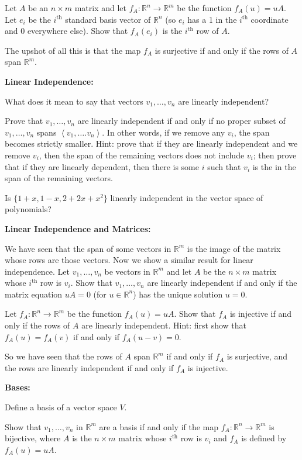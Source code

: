 \documentclass{article}
\newcommand{\SP}[1]{\left\langle #1 \right\rangle}
\begin{document}
Let $A$ be an $n\times m$ matrix and let $f_A:\mathbb{R}^n\to\mathbb{R}^m$ be the function $f_A(u)=uA$. Let $e_i$ be the $i^\mathrm{th}$ standard basis vector of $\mathbb{R}^n$ (so $e_i$ has a 1 in the $i^\mathrm{th}$ coordinate and 0 everywhere else). Show that $f_A(e_i)$ is the $i^\mathrm{th}$ row of $A$.

\vfill

The upshot of all this is that the map $f_A$ is surjective if and only if the rows of $A$ span $\mathbb{R}^m$.


\clearpage

\textbf{Linear Independence:}\bigskip


What does it mean to say that vectors $v_1,\hdots,v_n$ are linearly independent?

\vfill


Prove that $v_1,\hdots,v_n$ are linearly independent if and only if no proper subset of $v_1,\hdots,v_n$ spans $\SP{v_1,\hdots.v_n}$. In other words, if we remove any $v_i$, the span becomes strictly smaller. Hint: prove that if they are linearly independent and we remove $v_i$, then the span of the remaining vectors does not include $v_i$; then prove that if they are linearly dependent, then there is some $i$ such that $v_i$ is the in the span of the remaining vectors.

\vfill

Is $\{1+x,1-x,2+2x+x^2\}$ linearly independent in the vector space of polynomials?

\clearpage


\textbf{Linear Independence and Matrices:}\bigskip

We have seen that the span of some vectors in $\mathbb{R}^m$ is the image of the matrix whose rows are those vectors. Now we show a similar result for linear independence. Let $v_1,\hdots,v_n$ be vectors in $\mathbb{R}^m$ and let $A$ be the $n\times m$ matrix whose $i^\mathrm{th}$ row is $v_i$. Show that $v_1,\hdots,v_n$ are linearly independent if and only if the matrix equation $uA=0$ (for $u\in\mathbb{R}^n$) has the unique solution $u=0$.

\vfill

Let $f_A:\mathbb{R}^n\to\mathbb{R}^m$ be the function $f_A(u)=uA$. Show that $f_A$ is injective if and only if the rows of $A$ are linearly independent. Hint: first show that $f_A(u)=f_A(v)$ if and only if $f_A(u-v)=0$.

\vfill

So we have seen that the rows of $A$ span $\mathbb{R}^m$ if and only if $f_A$ is surjective, and the rows are linearly independent if and only if $f_A$ is injective.

\clearpage

\textbf{Bases:}\bigskip


Define a basis of a vector space $V$.
\vfill


Show that $v_1,\hdots,v_n$ in $\mathbb{R}^m$ are a basis if and only if the map $f_A:\mathbb{R}^n\to\mathbb{R}^m$ is bijective, where $A$ is the $n\times m$ matrix whose $i^\mathrm{th}$ row is $v_i$ and $f_A$ is defined by $f_A(u)=uA$.

\vfill
\end{document}
